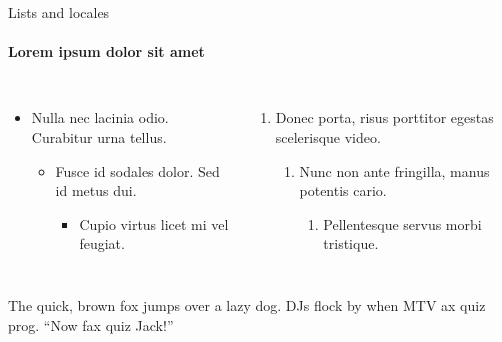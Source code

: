 \documentclass{beamer}
\begin{document}
      \begin{frame}[label=lists]{Lists and locales}
         \framesubtitle{Lorem ipsum dolor sit amet}

         \begin{columns}[onlytextwidth]
            
               \begin{itemize}
                  \item Nulla nec lacinia odio. Curabitur urna tellus.

                  \begin{itemize}
                     \item Fusce id sodales dolor. Sed id metus dui.

                     \begin{itemize}
                        \item Cupio virtus licet mi vel feugiat.
                     \end{itemize}

                  \end{itemize}

               \end{itemize}

               \begin{enumerate}
                  \item Donec porta, risus porttitor egestas scelerisque video.
                  
                  \begin{enumerate}
                     \item Nunc non ante fringilla, manus potentis cario.
                  
                     \begin{enumerate}
                        \item Pellentesque servus morbi tristique.
                     \end{enumerate}
                  
                  \end{enumerate}

               \end{enumerate}

         \end{columns}

         \bigskip
         \justifying


         {The quick, brown fox jumps over a lazy
         dog. DJs flock by when MTV ax quiz prog. “Now fax quiz Jack!”}
      \end{frame}
\end{document}
